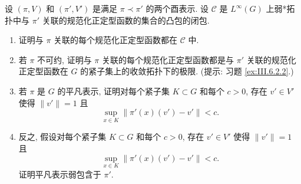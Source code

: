 \begin{exercise}[弱包含与弱*闭包]
\label{ex:III.6.2.4}
设 $(\pi, V)$ 和 $(\pi', V')$ 是满足 $\pi \prec \pi'$ 的两个酉表示. 设 $\mathcal{C}$ 是 $L^{\infty}(G)$ 上弱*拓扑中与 $\pi'$ 关联的规范化正定型函数的集合的凸包的闭包.
\begin{enumerate}
\item[(a)] 证明与 $\pi$ 关联的每个规范化正定型函数都在 $\mathcal{C}$ 中.
\item[(b)] 若 $\pi$ 不可约, 证明与 $\pi$ 关联的每个规范化正定型函数都是与 $\pi'$ 关联的规范化正定型函数在 $G$ 的紧子集上的收敛拓扑下的极限. (提示: 习题 \ref{ex:III.6.2.2}.)
\item[(c)] 若 $\pi$ 是 $G$ 的平凡表示, 证明对每个紧子集 $K \subset G$ 和每个 $c > 0$, 存在 $v' \in V'$ 使得 $\|v'\| = 1$ 且
\[
\sup_{x \in K}\|\pi'(x)(v') - v'\| < c.
\]
\item[(d)] 反之, 假设对每个紧子集 $K \subset G$ 和每个 $c > 0$, 存在 $v' \in V'$ 使得 $\|v'\| = 1$ 且
\[
\sup_{x \in K}\|\pi'(x)(v') - v'\| < c.
\]
证明平凡表示弱包含于 $\pi'$.
\end{enumerate}
\end{exercise}

